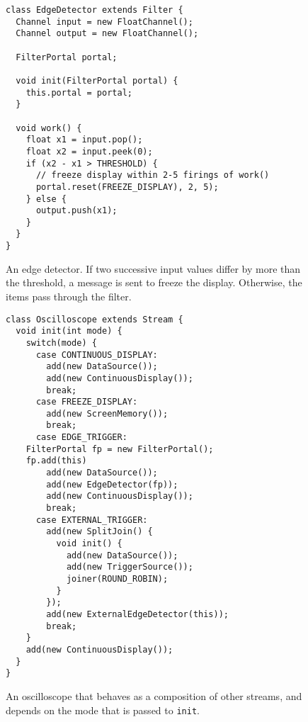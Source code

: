 \begin{figure}[t]
\scriptsize
\begin{verbatim}
class EdgeDetector extends Filter {
  Channel input = new FloatChannel();
  Channel output = new FloatChannel();
  
  FilterPortal portal;

  void init(FilterPortal portal) {
    this.portal = portal;
  }

  void work() {
    float x1 = input.pop();
    float x2 = input.peek(0);
    if (x2 - x1 > THRESHOLD) {
      // freeze display within 2-5 firings of work()
      portal.reset(FREEZE_DISPLAY), 2, 5);
    } else {
      output.push(x1);
    }
  }
}
\end{verbatim}
\vspace{-12pt}
\caption{\protect\small An edge detector.  If two successive input
values differ by more than the threshold, a message is sent to freeze
the display.  Otherwise, the items pass through the filter.
\protect\label{fig1}}
\vspace{-12pt}
\end{figure}

\begin{figure}[t]
\scriptsize
\begin{verbatim}
class Oscilloscope extends Stream {
  void init(int mode) {
    switch(mode) {
      case CONTINUOUS_DISPLAY:
        add(new DataSource());
        add(new ContinuousDisplay());
        break;
      case FREEZE_DISPLAY:
        add(new ScreenMemory());
        break;
      case EDGE_TRIGGER:
	FilterPortal fp = new FilterPortal();
	fp.add(this)
        add(new DataSource());
        add(new EdgeDetector(fp));
        add(new ContinuousDisplay());
        break;
      case EXTERNAL_TRIGGER:
        add(new SplitJoin() {
          void init() {
            add(new DataSource());
            add(new TriggerSource());
            joiner(ROUND_ROBIN);
          }
        });
        add(new ExternalEdgeDetector(this));
        break;
    }  
    add(new ContinuousDisplay());
  }
}
\end{verbatim}
\vspace{-12pt}
\caption{\protect\small An oscilloscope that behaves
as a composition of other streams, and depends on the mode that is
passed to {\tt init}.
\protect\label{fig2}}
\vspace{-12pt}
\end{figure}

